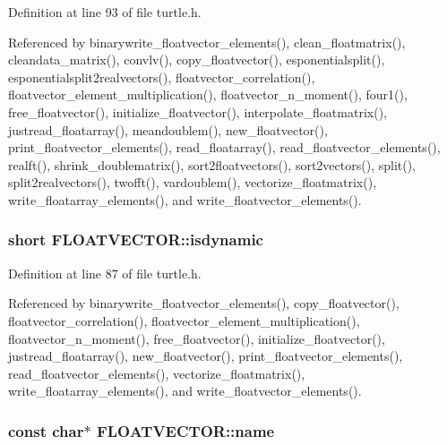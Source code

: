 Definition at line 93 of file turtle.\-h.



Referenced by binarywrite\-\_\-floatvector\-\_\-elements(), clean\-\_\-floatmatrix(), cleandata\-\_\-matrix(), convlv(), copy\-\_\-floatvector(), esponentialsplit(), esponentialsplit2realvectors(), floatvector\-\_\-correlation(), floatvector\-\_\-element\-\_\-multiplication(), floatvector\-\_\-n\-\_\-moment(), four1(), free\-\_\-floatvector(), initialize\-\_\-floatvector(), interpolate\-\_\-floatmatrix(), justread\-\_\-floatarray(), meandoublem(), new\-\_\-floatvector(), print\-\_\-floatvector\-\_\-elements(), read\-\_\-floatarray(), read\-\_\-floatvector\-\_\-elements(), realft(), shrink\-\_\-doublematrix(), sort2floatvectors(), sort2vectors(), split(), split2realvectors(), twofft(), vardoublem(), vectorize\-\_\-floatmatrix(), write\-\_\-floatarray\-\_\-elements(), and write\-\_\-floatvector\-\_\-elements().

\hypertarget{struct_f_l_o_a_t_v_e_c_t_o_r_aead1bf05202464aeb2d3b722901b2ab9}{
\subsubsection[{isdynamic}]{\setlength{\rightskip}{0pt plus 5cm}short F\-L\-O\-A\-T\-V\-E\-C\-T\-O\-R\-::isdynamic}}\label{struct_f_l_o_a_t_v_e_c_t_o_r_aead1bf05202464aeb2d3b722901b2ab9}


Definition at line 87 of file turtle.\-h.



Referenced by binarywrite\-\_\-floatvector\-\_\-elements(), copy\-\_\-floatvector(), floatvector\-\_\-correlation(), floatvector\-\_\-element\-\_\-multiplication(), floatvector\-\_\-n\-\_\-moment(), free\-\_\-floatvector(), initialize\-\_\-floatvector(), justread\-\_\-floatarray(), new\-\_\-floatvector(), print\-\_\-floatvector\-\_\-elements(), read\-\_\-floatvector\-\_\-elements(), vectorize\-\_\-floatmatrix(), write\-\_\-floatarray\-\_\-elements(), and write\-\_\-floatvector\-\_\-elements().

\hypertarget{struct_f_l_o_a_t_v_e_c_t_o_r_a02528330e860856d608d3e836cb1d818}{
\subsubsection[{name}]{\setlength{\rightskip}{0pt plus 5cm}const char$\ast$ F\-L\-O\-A\-T\-V\-E\-C\-T\-O\-R\-::name}}\label{struct_f_l_o_a_t_v_e_c_t_o_r_a02528330e860856d608d3e836cb1d818}


